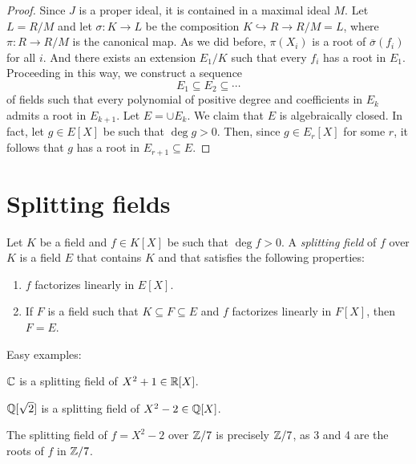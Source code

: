 \begin{proof}
    Since $J$ is a proper ideal, it is contained in a maximal ideal $M$. Let $L=R/M$ 
    and let $\sigma\colon K\to L$ be the composition $K\hookrightarrow R\to R/M=L$, 
    where $\pi\colon R\to R/M$ is the canonical map.  
    As we did before,
    $\pi(X_i)$ is a root of $\overline{\sigma}(f_i)$ for all $i$. And 
    there exists an extension $E_1/K$ such that
    every $f_i$ has a root in $E_1$. Proceeding in this way, we construct
    a sequence
    \[
    E_1\subseteq E_2\subseteq\cdots
    \]
    of fields such that every polynomial of positive degree and coefficients in $E_k$ 
    admits a root in $E_{k+1}$. Let $E=\cup E_k$. We claim that $E$ is algebraically closed. In fact, 
    let $g\in E[X]$ be such that $\deg g>0$. Then, since $g\in E_r[X]$ for some $r$, it follows
    that $g$ has a root in $E_{r+1}\subseteq E$. 
\end{proof}

\section{Splitting fields}


\begin{definition}
\label{def:splitting_field}
\label{def:decomposition_field}
	Let $K$ be a field and $f\in K[X]$ be such that $\deg f>0$. A \emph{splitting field} of $f$ over $K$ is a field $E$ that contains $K$ and that satisfies the following properties:
	\begin{enumerate}
		\item $f$ factorizes linearly in $E[X]$. 
		\item If $F$ is a field such that $K\subseteq F\subseteq E$ and 
			$f$ factorizes
			linearly in $F[X]$, then $F=E$. 
	\end{enumerate}
\end{definition}

Easy examples: 

\begin{example}
	$\mathbb{C}$ is a splitting field of $X^2+1\in\mathbb{R}[X]$. 
\end{example}

\begin{example}
	$\mathbb{Q}[\sqrt{2}]$ is a splitting field of $X^2-2\in\mathbb{Q}[X]$. 
\end{example}

\begin{example}
    The splitting field of $f=X^2-2$ over $\mathbb{Z}/7$ is 
    precisely $\mathbb{Z}/7$, as 3 and 4 are the roots of $f$ in $\mathbb{Z}/7$. 
\end{example}

